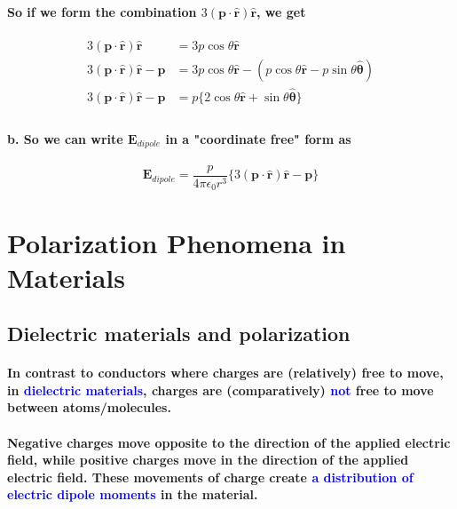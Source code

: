 \documentclass{article}
\begin{document}
\paragraph{\indent So if we form the combination $3(\boldsymbol{p\cdot\hat{r}})\hat{\boldsymbol{r}}$, we get}
\begin{align*}
    3(\boldsymbol{p\cdot\hat{r}})\hat{\boldsymbol{r}}&=3p\cos\theta \hat{\boldsymbol{r}}\\
    3(\boldsymbol{p\cdot\hat{r}})\hat{\boldsymbol{r}}-\boldsymbol{p}&=3p\cos\theta\hat{\boldsymbol{r}}-(p\cos\theta\hat{\boldsymbol{r}}-p\sin\theta\hat{\boldsymbol{\theta}})\\
    3(\boldsymbol{p\cdot\hat{r}})\hat{\boldsymbol{r}}-\boldsymbol{p}&=p\{ 2\cos\theta\hat{\boldsymbol{r}}+\sin\theta\hat{\boldsymbol{\theta}}\}\\
\end{align*}
\paragraph{\indent b. So we can write $\boldsymbol{E}_{dipole}$ in a "coordinate free" form as }
\begin{equation*}
    \boldsymbol{E}_{dipole}=\frac{p}{4\pi\epsilon_0r^3}\{3(\boldsymbol{p\cdot\hat{r}})\hat{\boldsymbol{r}}-\boldsymbol{p}\}
\end{equation*}
\section{Polarization Phenomena in Materials}
\subsection{Dielectric materials and polarization}
\paragraph{\indent In contrast to conductors where charges are (relatively) free to move, in \textcolor{blue}{dielectric materials}, charges are (comparatively) \textcolor{blue}{not} free to move between atoms/molecules.}
\paragraph{\indent Negative charges move opposite to the direction of the applied electric field, while positive charges move in the direction of the applied electric field. These movements of charge create \textcolor{blue}{a distribution of electric dipole moments} in the material.}
\end{document}
